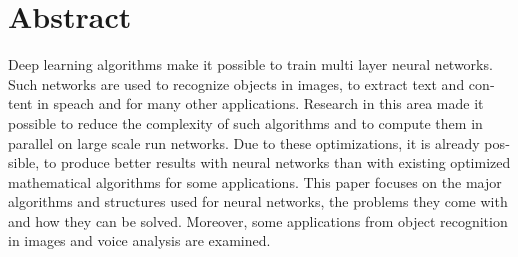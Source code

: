 \chapter{Abstract}

\begin{english} %
Deep learning algorithms make it possible to train multi layer neural networks. Such networks are used to recognize objects in images, to extract text and content in speach and for many other applications. Research in this area made it possible to reduce the complexity of such algorithms and to compute them in parallel on large scale run networks. Due to these optimizations, it is already possible, to produce better results with neural networks than with existing optimized mathematical algorithms for some applications. This paper focuses on the major algorithms and structures used for neural networks, the problems they come with and how they can be solved. Moreover, some applications from object recognition in images and voice analysis are examined.
\end{english}